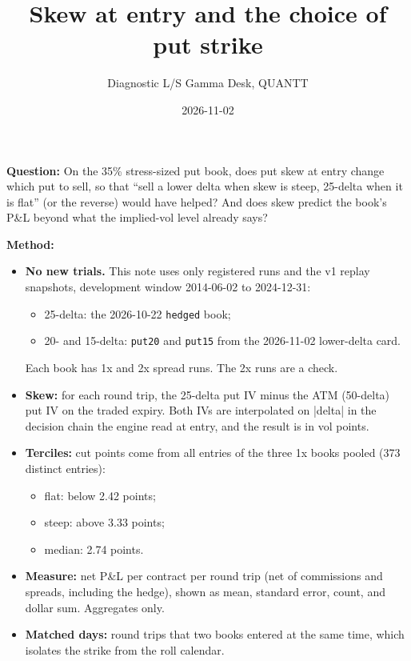 \documentclass{article}
\title{Skew at entry and the choice of put strike}
\author{Diagnostic \textperiodcentered{} L/S Gamma Desk, QUANTT}
\date{2026-11-02}
\begin{document}
\maketitle

\textbf{Question:} On the 35\% stress-sized put book, does put skew at entry change which put to sell, so that ``sell a lower delta when skew is steep, 25-delta when it is flat'' (or the reverse) would have helped? And does skew predict the book's P\&L beyond what the implied-vol level already says?

\textbf{Method:}

\begin{itemize}

\item \textbf{No new trials.} This note uses only registered runs and the v1 replay snapshots, development window 2014-06-02 to 2024-12-31:

\begin{itemize}

\item 25-delta: the 2026-10-22 \texttt{hedged} book;

\item 20- and 15-delta: \texttt{put20} and \texttt{put15} from the 2026-11-02 lower-delta card.

\end{itemize}

Each book has 1x and 2x spread runs. The 2x runs are a check.

\item \textbf{Skew:} for each round trip, the 25-delta put IV minus the ATM (50-delta) put IV on the traded expiry. Both IVs are interpolated on |delta| in the decision chain the engine read at entry, and the result is in vol points.

\item \textbf{Terciles:} cut points come from all entries of the three 1x books pooled (373 distinct entries):

\begin{itemize}

\item flat: below 2.42 points;

\item steep: above 3.33 points;

\item median: 2.74 points.

\end{itemize}

\item \textbf{Measure:} net P\&L per contract per round trip (net of commissions and spreads, including the hedge), shown as mean, standard error, count, and dollar sum. Aggregates only.

\item \textbf{Matched days:} round trips that two books entered at the same time, which isolates the strike from the roll calendar.

\end{itemize}
\end{document}
